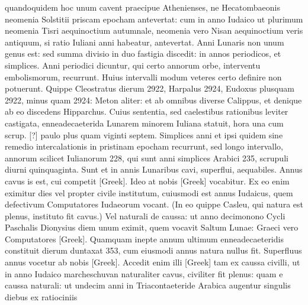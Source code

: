 quandoquidem hoc unum cavent praecipue Athenienses,
 ne Hecatombaeonis
neomenia Solstitii priscam epocham antevertat: cum in
anno Iudaico ut plurimum neomenia Tisri aequinoctium autumnale,
neomenia vero Nisan aequinoctium veris antiquum, si ratio Iuliani
anni habeatur, antevertat.
Anni Lunaris non unum genus est: sed
summa divisio in duo fastigia discedit: in annos periodicos, et simplices.
Anni periodici dicuntur, qui certo annorum orbe, interventu
embolismorum, recurrunt.
Huius intervalli modum veteres certo
definire non potuerunt.
Quippe Cleostratus dierum 2922, Harpalus
2924, Eudoxus plusquam 2922, minus quam 2924: Meton aliter:
et ab omnibus diverse Calippus, et denique ab eo discedens Hipparchus.
Cuius sententia, sed caelestibus rationibus leviter castigata,
 enneadecaeterida
Lunarem minorem Iuliana statuit, hora una cum scrup. [?] paulo
plus quam viginti septem.
Simplices anni et ipsi quidem sine remedio
intercalationis in pristinam epocham recurrunt, sed longo intervallo,
annorum scilicet Iulianorum 228, qui sunt anni simplices Arabici 235,
scrupuli diurni quinquaginta.
Sunt et in annis Lunaribus cavi, superflui,
aequabiles.
Annus cavus is est, cui competit \textgreek{[Greek]}.
Ideo at nobis \textgreek{[Greek]} vocabitur.
Ex eo enim eximitur dies
vel propter civile institutum, cuiusmodi est annus Iudaicus,
quem defectivum
Computatores Iudaeorum vocant.
(In eo quippe Casleu, qui natura est plenus, instituto fit cavus.)
Vel naturali de caussa: ut anno
decimonono Cycli Paschalis Dionysius diem unum eximit, quem
vocavit Saltum Lunae: Graeci vero Computatores \textgreek{[Greek]}.
Quamquam inepte annum ultimum enneadecaeteridis constituit dierum
duntaxat 353, cum eiusmodi annus natura nullus fit.
Superfluus
annus vocetur ab nobis \textgreek{[Greek]}.
Accedit enim illi \textgreek{[Greek]}
tam ex caussa civilli, ut in anno Iudaico marcheschuvan naturaliter
cavus, civiliter fit plenus: quam e caussa naturali: ut undecim anni
in Triacontaeteride Arabica augentur singulis diebus ex ratiociniis
